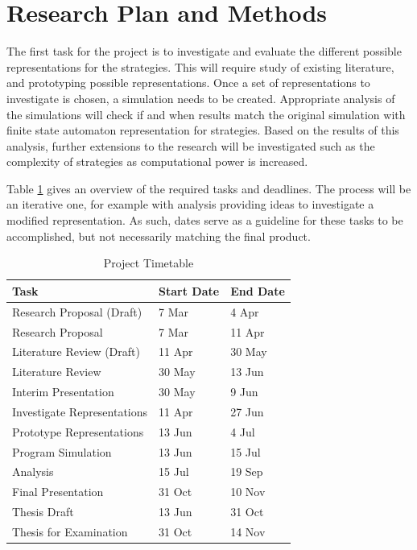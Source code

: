 \documentclass[a4paper,11pt]{article}
\begin{document}
\section{Research Plan and Methods}
The first task for the project is to investigate and evaluate the different possible representations for the strategies. 
This will require study of existing literature, and prototyping possible representations. 
Once a set of representations to investigate is chosen, a simulation needs to be created. 
Appropriate analysis of the simulations will check if and when results match the original simulation with finite state automaton representation for strategies. 
Based on the results of this analysis, further extensions to the research will be investigated such as the complexity of strategies as computational power is increased.

Table \ref{tbl:timetable} gives an overview of the required tasks and deadlines. 
The process will be an iterative one, for example with analysis providing ideas to investigate a modified representation. 
As such, dates serve as a guideline for these tasks to be accomplished, but not necessarily matching the final product.
\begin{table}[0.5\textwidth]
\centering
\captionsetup{justification=centering}
\begin{tabular}{|l|l|l|}
\hline
Task & Start Date & End Date\\
\hline
Research Proposal (Draft) &  7 Mar & 4 Apr\\
\hline
Research Proposal & 7 Mar &11 Apr \\
\hline
Literature Review (Draft) & 11 Apr &30 May\\
\hline
Literature Review & 30 May & 13 Jun\\
\hline
Interim Presentation & 30 May &9 Jun\\
\hline
Investigate Representations & 11 Apr & 27 Jun \\
\hline
Prototype Representations & 13 Jun & 4 Jul\\
\hline
Program Simulation & 13 Jun & 15 Jul \\
\hline
Analysis & 15 Jul  & 19 Sep\\
\hline
Final Presentation & 31 Oct & 10 Nov\\
\hline
Thesis Draft & 13 Jun & 31 Oct\\
\hline
Thesis for Examination &31 Oct & 14 Nov\\
\hline
\end{tabular}
\caption{Project Timetable}
\label{tbl:timetable}
\end{table}
\end{document}
